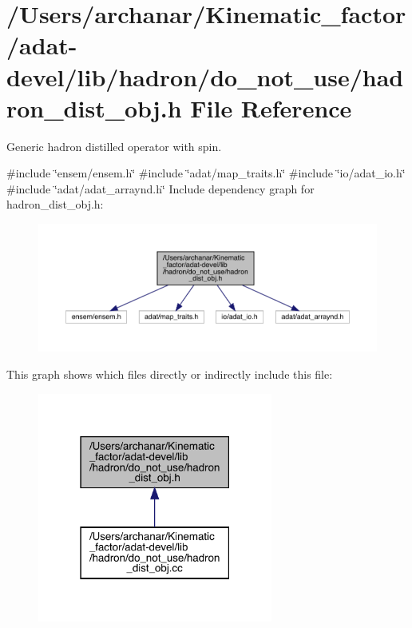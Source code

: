 \hypertarget{adat-devel_2lib_2hadron_2do__not__use_2hadron__dist__obj_8h}{}\section{/\+Users/archanar/\+Kinematic\+\_\+factor/adat-\/devel/lib/hadron/do\+\_\+not\+\_\+use/hadron\+\_\+dist\+\_\+obj.h File Reference}
\label{adat-devel_2lib_2hadron_2do__not__use_2hadron__dist__obj_8h}


Generic hadron distilled operator with spin.  


{\ttfamily \#include \char`\"{}ensem/ensem.\+h\char`\"{}}\newline
{\ttfamily \#include \char`\"{}adat/map\+\_\+traits.\+h\char`\"{}}\newline
{\ttfamily \#include \char`\"{}io/adat\+\_\+io.\+h\char`\"{}}\newline
{\ttfamily \#include \char`\"{}adat/adat\+\_\+arraynd.\+h\char`\"{}}\newline
Include dependency graph for hadron\+\_\+dist\+\_\+obj.\+h\+:
\nopagebreak
\begin{figure}[H]
\begin{center}
\leavevmode
\includegraphics[width=350pt]{db/dcb/adat-devel_2lib_2hadron_2do__not__use_2hadron__dist__obj_8h__incl}
\end{center}
\end{figure}
This graph shows which files directly or indirectly include this file\+:
\nopagebreak
\begin{figure}[H]
\begin{center}
\leavevmode
\includegraphics[width=219pt]{d1/d6e/adat-devel_2lib_2hadron_2do__not__use_2hadron__dist__obj_8h__dep__incl}
\end{center}
\end{figure}
